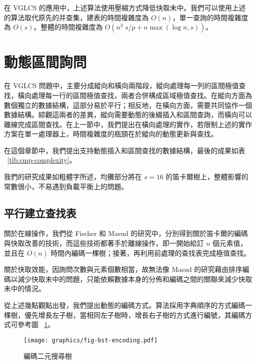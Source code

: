 



在 VGLCS 的應用中，上述算法使用壓縮方式降低快取未中。我們可以使用上述的算法取代原先的并查集，建表的時間複雜度為 $O(n)$，單一查詢的時間複雜度為 $O(s)$。整體的時間複雜度為 $O(n^2 \; s / p + n \max(\log n, s))$。

\section{動態區間詢問}

在 VGLCS 問題中，主要分成縱向和橫向兩階段，縱向處理每一列的區間極值查找，橫向處理每一行的區間極值查找，兩者合併構成區域極值查找。在縱向方面為數個獨立的數據結構，這部分易於平行；相反地，在橫向方面，需要共同協作一個數據結構。綜觀這兩者的差異，縱向需要動態的後綴插入和區間查詢，而橫向可以離線完成區間查找。在上一節中，我們提出在橫向處理的實作，若限制上述的實作方案在單一處理器上，時間複雜度的瓶頸在於縱向的動態更新與查找。

在這個章節中，我們提出支持動態插入和區間查找的數據結構，最後的成果如表 ~\ref{tlb:cmp-complexity}。

\begin{table*}
  \centering
  
  \caption{我們的研究成果如粗體字所述，均攤部分將在 $s=16$ 的笛卡爾樹上，整體影響的常數很小，不易遇到負載平衡上的問題。}
  \label{tlb:cmp-complexity}
\end{table*}

\subsection{平行建立查找表}

關於在線操作，我們從 Fischer \cite{fischer} 和 Masud \cite{masud} 的研究中，分別得到關於笛卡爾的編碼與快取改善的技術，而這些技術都著手於離線操作，即一開始給訂 $n$ 個元素值，並且在 $O(n)$ 時間內編碼一棵樹；接著，再利用前處理的查找表完成極值查找。

關於快取效能，因詢問次數與元素個數相當，故無法像 Masud \cite{masud} 的研究藉由排序編碼以減少快取未中的問題，只能依賴數據本身的分佈和編碼之間的關聯來減少快取未中的情況。

從上述幾點觀點出發，我們提出動態的編碼方式。算法採用字典順序的方式編碼一棵樹，優先增長左子樹，當相同左子樹時，增長右子樹的方式進行編號，其編碼方式可參考圖 ~\ref{fig:lablingBST}。

\begin{figure}[!thb]
  \centering
  \texttt{[image: graphics/fig-bst-encoding.pdf]}
  \caption{編碼二元搜尋樹}
  \label{fig:lablingBST}
\end{figure}


